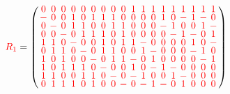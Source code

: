 \documentclass{beamer}
\newcommand{\rred}[1]{\textcolor{red}{#1}}
\begin{document}
\begin{frame}

  \[
    \rred{R_1} =
    \left(
      \arraycolsep=1.25pt\def\arraystretch{0.625}
      \begin{array}{cccccccccccccccccc}
        \rred{0}&\rred{0}&\rred{0}&\rred{0}&\rred{0}&\rred{0}&\rred{0}&\rred{0}&\rred{0}&\rred{1}&\rred{1}&\rred{1}&\rred{1}&\rred{1}&\rred{1}&\rred{1}&\rred{1}&\rred{1}\\
        \rred{-}&\rred{0}&\rred{0}&\rred{1}&\rred{0}&\rred{1}&\rred{1}&\rred{1}&\rred{0}&\rred{0}&\rred{0}&\rred{0}&\rred{1}&\rred{0}&\rred{-}&\rred{1}&\rred{-}&\rred{0}\\
        \rred{0}&\rred{-}&\rred{0}&\rred{1}&\rred{1}&\rred{0}&\rred{0}&\rred{1}&\rred{1}&\rred{0}&\rred{0}&\rred{0}&\rred{-}&\rred{1}&\rred{0}&\rred{0}&\rred{1}&\rred{-}\\
        \rred{0}&\rred{0}&\rred{-}&\rred{0}&\rred{1}&\rred{1}&\rred{1}&\rred{0}&\rred{1}&\rred{0}&\rred{0}&\rred{0}&\rred{0}&\rred{-}&\rred{1}&\rred{-}&\rred{0}&\rred{1}\\
        \rred{1}&\rred{1}&\rred{0}&\rred{-}&\rred{0}&\rred{0}&\rred{1}&\rred{0}&\rred{1}&\rred{1}&\rred{-}&\rred{0}&\rred{0}&\rred{0}&\rred{0}&\rred{1}&\rred{0}&\rred{-}\\
        \rred{0}&\rred{1}&\rred{1}&\rred{0}&\rred{-}&\rred{0}&\rred{1}&\rred{1}&\rred{0}&\rred{0}&\rred{1}&\rred{-}&\rred{0}&\rred{0}&\rred{0}&\rred{-}&\rred{1}&\rred{0}\\
        \rred{1}&\rred{0}&\rred{1}&\rred{0}&\rred{0}&\rred{-}&\rred{0}&\rred{1}&\rred{1}&\rred{-}&\rred{0}&\rred{1}&\rred{0}&\rred{0}&\rred{0}&\rred{0}&\rred{-}&\rred{1}\\
        \rred{1}&\rred{0}&\rred{1}&\rred{1}&\rred{1}&\rred{0}&\rred{-}&\rred{0}&\rred{0}&\rred{1}&\rred{0}&\rred{-}&\rred{1}&\rred{-}&\rred{0}&\rred{0}&\rred{0}&\rred{0}\\
        \rred{1}&\rred{1}&\rred{0}&\rred{0}&\rred{1}&\rred{1}&\rred{0}&\rred{-}&\rred{0}&\rred{-}&\rred{1}&\rred{0}&\rred{0}&\rred{1}&\rred{-}&\rred{0}&\rred{0}&\rred{0}\\
        \rred{0}&\rred{1}&\rred{1}&\rred{1}&\rred{0}&\rred{1}&\rred{0}&\rred{0}&\rred{-}&\rred{0}&\rred{-}&\rred{1}&\rred{-}&\rred{0}&\rred{1}&\rred{0}&\rred{0}&\rred{0}\\
      \end{array}
    \right)
  \]
  
\end{frame}
\end{document}
